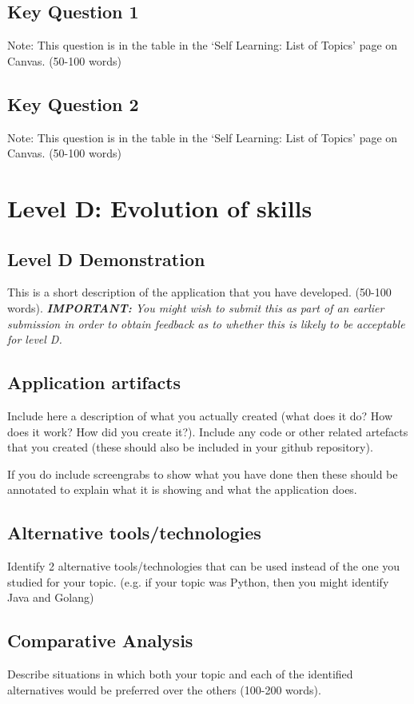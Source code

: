 \documentclass[a4paper, 11pt]{report}
\begin{document}
\subsection{Key Question 1}
Note: This question is in the table in the ‘Self Learning: List of Topics’ page on Canvas. (50-100 words)

\subsection{Key Question 2}
Note: This question is in the table in the ‘Self Learning: List of Topics’ page on Canvas. (50-100 words)



\newpage
\section{Level D: Evolution of skills}
\vspace{5mm}
\subsection{Level D Demonstration}

This is a short description of the application that you have developed. (50-100 words).
\textit{{\bf IMPORTANT:} You might wish to submit this as part of an earlier submission in order to obtain feedback as to whether this is likely to be acceptable for level D.}

\subsection{Application artifacts}

Include here a description of what you actually created (what does it do? How does it work? How did you create it?). Include any code or other related artefacts that you created (these should also be included in your github repository).

If you do include screengrabs to show what you have done then these should be annotated to explain what it is showing and what the application does.

\subsection{Alternative tools/technologies}
Identify 2 alternative tools/technologies that can be used instead of the one you studied for your topic. (e.g. if your topic was Python, then you might identify Java and Golang)
\subsection{Comparative Analysis}
Describe situations in which both your topic and each of the identified alternatives would be preferred over the others (100-200 words).





\newpage


\printbibliography
\end{document}
